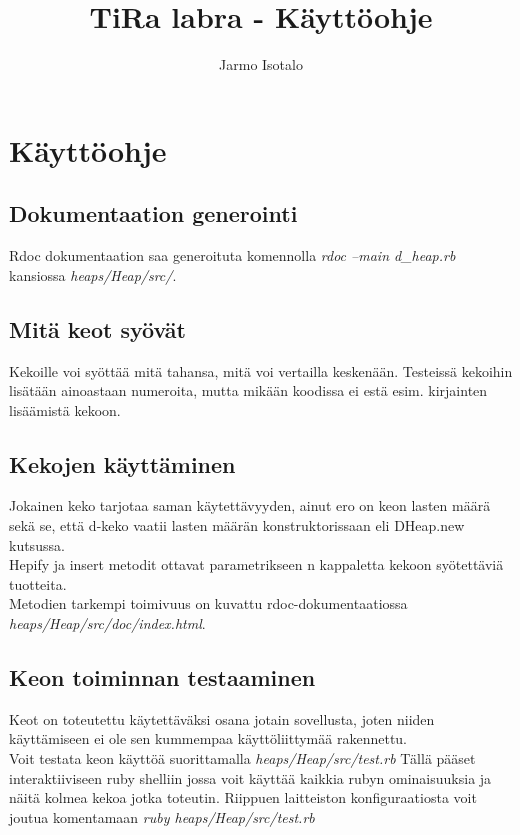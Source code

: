 \documentclass[a4paper,12pt]{article}
\begin{document}
\title{TiRa labra - Käyttöohje} 
\author{Jarmo Isotalo}
\maketitle

\section{Käyttöohje}
\subsection{Dokumentaation generointi}
Rdoc dokumentaation saa generoituta komennolla \emph{rdoc --main d\_heap.rb} kansiossa  \emph{heaps/Heap/src/}.

\subsection{Mitä keot syövät}
Kekoille voi syöttää mitä tahansa, mitä voi vertailla keskenään. Testeissä kekoihin lisätään ainoastaan numeroita, mutta mikään koodissa ei estä esim. kirjainten lisäämistä kekoon.


\subsection{Kekojen käyttäminen}
Jokainen keko tarjotaa saman käytettävyyden, ainut ero on keon lasten määrä sekä se, että d-keko vaatii lasten määrän konstruktorissaan eli DHeap.new kutsussa.\\


Hepify ja insert metodit ottavat parametrikseen n kappaletta kekoon syötettäviä tuotteita.\\

Metodien tarkempi toimivuus on kuvattu rdoc-dokumentaatiossa \emph{heaps/Heap/src/doc/index.html}.

\subsection{Keon toiminnan testaaminen}
Keot on toteutettu käytettäväksi osana jotain sovellusta, joten niiden käyttämiseen ei ole sen kummempaa käyttöliittymää rakennettu.\\

Voit testata keon käyttöä suorittamalla \emph{heaps/Heap/src/test.rb} Tällä pääset interaktiiviseen ruby shelliin jossa voit käyttää kaikkia rubyn ominaisuuksia ja näitä kolmea kekoa jotka toteutin. Riippuen laitteiston konfiguraatiosta voit joutua komentamaan  \emph{ruby heaps/Heap/src/test.rb}  \\
\end{document}
